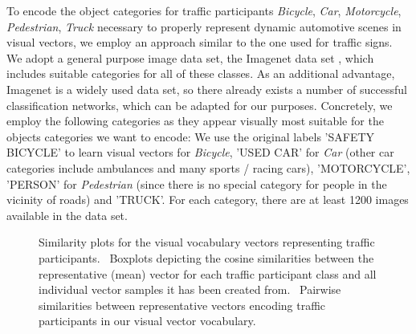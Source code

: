 To encode the object categories for traffic participants \emph{Bicycle}, \emph{Car}, \emph{Motorcycle}, \emph{Pedestrian}, \emph{Truck} necessary to properly represent dynamic automotive scenes in visual vectors, we employ an approach similar to the one used for traffic signs.
We adopt a general purpose image data set, the Imagenet data set \parencite{Deng2009}, which includes suitable categories for all of these classes.
As an additional advantage, Imagenet is a widely used data set, so there already exists a number of successful classification networks, which can be adapted for our purposes.
Concretely, we employ the following categories as they appear visually most suitable for the objects categories we want to encode:
We use the original labels 'SAFETY BICYCLE' to learn visual vectors for \emph{Bicycle}, 'USED CAR' for \emph{Car} (other car categories include ambulances and many sports / racing cars), 'MOTORCYCLE', 'PERSON' for \emph{Pedestrian} (since there is no special category for people in the vicinity of roads) and 'TRUCK'.
For each category, there are at least \num{1200} images available in the data set.

\begin{figure}[t]
    \centering
    \caption{Similarity plots for the visual vocabulary vectors representing traffic participants.~\protect{} Boxplots depicting the cosine similarities between the representative (mean) vector for each traffic participant class and all individual vector samples it has been created from.~\protect{} Pairwise similarities between representative
    vectors encoding traffic participants in our visual vector vocabulary.}
    \label{fig:visual_vocab_traffic_participants}
\end{figure}

